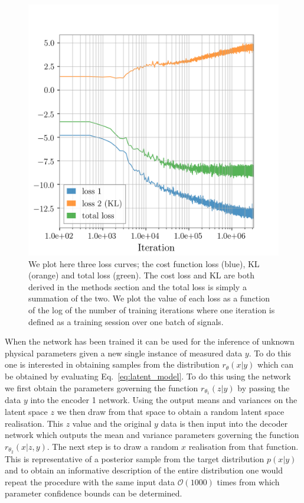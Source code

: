 \documentclass[%
showpacs,
 amsmath,amssymb,
 aps,
 twocolumn,
 prl,
 reprint,
floatfix,
]{revtex4-1}
\begin{document}
%
%
\begin{figure}
    \includegraphics[width=\columnwidth]{images/inv_losses_log.png}
\caption{\label{fig:loss_log} We plot here three loss curves; the cost
function loss (blue), KL (orange) and total loss (green). The cost  loss and KL
are both derived in the methods section and the total loss is simply a
summation of the two. We plot the value of each loss as a function of the log
of the number of training iterations where one iteration is defined as a
training session over one batch of signals.}
\end{figure}

When the network has been trained it can be used for the inference of unknown
physical parameters given a new single instance of measured data $y$. To do
this one is interested in obtaining samples from the distribution
$r_{\theta}(x|y)$ which can be obtained by evaluating
Eq.~\ref{eq:latent_model}. To do this using the network we first obtain the
parameters governing the function $r_{\theta_{1}}(z|y)$ by passing the data $y$
into the encoder 1 network. Using the output means and variances on the latent space
$z$ we then draw from that space to obtain a random latent space realisation.
This $z$ value and the original $y$ data is then input into the decoder network
which outputs the mean and variance parameters governing the function
$r_{\theta_{2}}(x|z,y)$. The next step is to draw a random $x$ realisation from
that function. This is representative of a posterior sample from the target
distribution $p(x|y)$ and to obtain an informative description of the entire
distribution one would repeat the procedure with the same input data
$\mathcal{O}(1000)$ times from which parameter confidence bounds can be
determined.      
\end{document}
